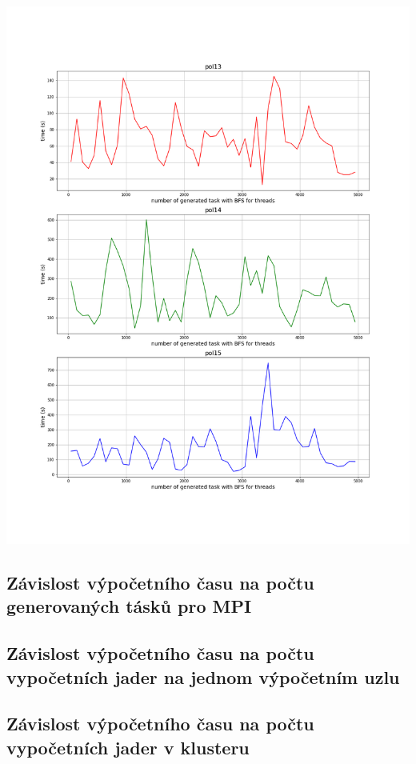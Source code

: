\documentclass[]{article}
\begin{document}
\begin{center}
    \includegraphics[scale=0.44]{nN.png}
    
     \label{obr1.1}
     
    \end{center}


\subsection{Závislost výpočetního času na počtu generovaných tásků pro MPI}

\subsection{Závislost výpočetního času na počtu vypočetních jader na jednom výpočetním uzlu}

\subsection{Závislost výpočetního času na počtu vypočetních jader v klusteru}
\end{document}
